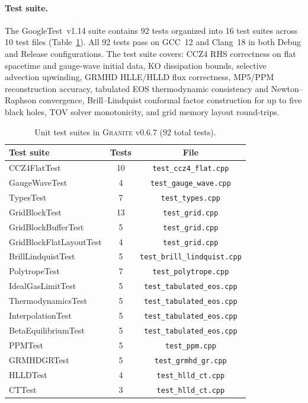 \documentclass[aps,prd,twocolumn,superscriptaddress,nofootinbib,showpacs,
               longbibliography]{revtex4-2}
\newcommand{\granite}{\textsc{Granite}}
\newcommand{\code}[1]{\texttt{#1}}
\begin{document}
\paragraph{Test suite.}
\label{sec:testing}
The GoogleTest~v1.14 suite contains 92 tests organized into 16 test suites
across 10 test files (Table~\ref{tab:tests}).
All 92 tests pass on GCC~12 and Clang~18 in both Debug and Release
configurations.
The test suite covers: CCZ4 RHS correctness on flat spacetime and gauge-wave
initial data, KO dissipation bounds, selective advection upwinding, GRMHD
HLLE/HLLD flux correctness, MP5/PPM reconstruction accuracy, tabulated EOS
thermodynamic consistency and Newton--Raphson convergence, Brill--Lindquist
conformal factor construction for up to five black holes, TOV solver
monotonicity, and grid memory layout round-trips.

\begin{table}[t]
\caption{Unit test suites in \granite{} v0.6.7 (92 total tests).}
\label{tab:tests}
\begin{ruledtabular}
\begin{tabular}{lcc}
  Test suite & Tests & File \\ \hline
  CCZ4FlatTest      & 10 & \code{test\_ccz4\_flat.cpp} \\
  GaugeWaveTest     &  4 & \code{test\_gauge\_wave.cpp} \\
  TypesTest         &  7 & \code{test\_types.cpp} \\
  GridBlockTest     & 13 & \code{test\_grid.cpp} \\
  GridBlockBufferTest & 5 & \code{test\_grid.cpp} \\
  GridBlockFlatLayoutTest & 4 & \code{test\_grid.cpp} \\
  BrillLindquistTest & 5 & \code{test\_brill\_lindquist.cpp} \\
  PolytropeTest     &  7 & \code{test\_polytrope.cpp} \\
  IdealGasLimitTest &  5 & \code{test\_tabulated\_eos.cpp} \\
  ThermodynamicsTest & 5 & \code{test\_tabulated\_eos.cpp} \\
  InterpolationTest &  5 & \code{test\_tabulated\_eos.cpp} \\
  BetaEquilibriumTest & 5 & \code{test\_tabulated\_eos.cpp} \\
  PPMTest           &  5 & \code{test\_ppm.cpp} \\
  GRMHDGRTest       &  5 & \code{test\_grmhd\_gr.cpp} \\
  HLLDTest          &  4 & \code{test\_hlld\_ct.cpp} \\
  CTTest            &  3 & \code{test\_hlld\_ct.cpp} \\
\end{tabular}
\end{ruledtabular}
\end{table}
\end{document}
